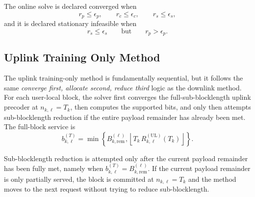 \documentclass[11pt]{article}
\newcommand{\floor}[1]{\left\lfloor #1 \right\rfloor}
\newcommand{\UL}{\mathrm{UL}}
\begin{document}
The online solve is declared converged when
\begin{equation}
r_p \le \epsilon_p,
\qquad
r_c \le \epsilon_c,
\qquad
r_s \le \epsilon_s,
\label{eq:kkt-convergence}
\end{equation}
and it is declared stationary infeasible when
\begin{equation}
r_s \le \epsilon_s
\qquad \text{but} \qquad
r_p > \epsilon_p.
\label{eq:kkt-stationary-infeasible}
\end{equation}

\subsection{Uplink Training Only Method}

The uplink training-only method is fundamentally sequential, but it follows the
same \emph{converge first, allocate second, reduce third} logic as the
downlink method. For each user-local block, the solver first converges the
full-sub-blocklength uplink precoder at $n_{k,\ell}=T_k$, then computes the
supported bits, and only then attempts sub-blocklength reduction if the entire
payload remainder has already been met. The
full-block service is
\begin{equation}
b_{k,\ell}^{(T)}
=
\min\!\left\{
B_{k,\mathrm{rem}}^{(\ell)},
\floor{T_k\,R_{k,\ell}^{(\UL)}(T_k)}
\right\}.
\label{eq:ul-full-block-service}
\end{equation}



Sub-blocklength reduction is attempted only after the current payload remainder
has been fully met, namely when
$b_{k,\ell}^{(T)} = B_{k,\mathrm{rem}}^{(\ell)}$. If the current payload remainder is
only partially served, the block is committed at $n_{k,\ell}=T_k$ and the
method moves to the next request without trying to reduce sub-blocklength.
\end{document}
